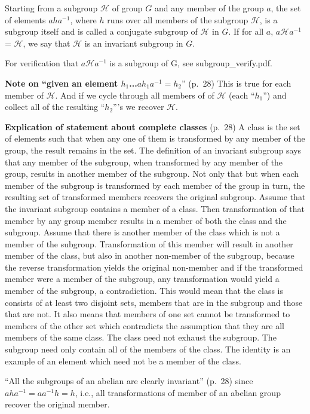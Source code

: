 Starting from a subgroup $\mathcal H$ of group $G$ and any member of
the group $a$, the set of elements $aha^{-1}$, where $h$ runs over all
members of the subgroup $\mathcal H$, is a subgroup itself and is
called a conjugate subgroup of $\mathcal H$ in $G$. If for all $a$,
$a{\mathcal H} a^{-1}$ = $\mathcal H$, we say that $\mathcal H$ is an
invariant subgroup in $G$.

For verification that $a\mathcal Ha^{-1}$ is a subgroup of G, see
subgroup\_verify.pdf.

{\bf Note on ``given an element $h_1$...$ah_1a^{-1} = h_2$}'' (p.\ 28) This is true for each member of $\mathcal H$. And if we cycle
through all members of of $\mathcal H$ (each ``$h_1$'') and collect
all of the resulting ``$h_2$'''s we recover $\mathcal H$.

{\bf Explication of statement about complete classes} (p.\ 28) A class
is the set of elements such that when any one of them is transformed
by any member of the group, the result remains in the set. The
definition of an invariant subgroup says that any member of the
subgroup, when transformed by any member of the group, results in
another member of the subgroup.  Not only that but when each member of
the subgroup is transformed by each member of the group in turn, the
resulting set of transformed members recovers the original
subgroup. Assume that the invariant subgroup contains a member of a
class. Then transformation of that member by any group member results
in a member of both the class and the subgroup. Assume that there is
another member of the class which is not a member of the
subgroup. Transformation of this member will result in another member
of the class, but also in another non-member of the subgroup, because
the reverse transformation yields the original non-member and if the
transformed member were a member of the subgroup, any transformation
would yield a member of the subgroup, a contradiction. This would mean
that the class is consists of at least two disjoint sets, members that
are in the subgroup and those that are not. It also means that members
of one set cannot be transformed to members of the other set which
contradicts the assumption that they are all members of the same
class. The class need not exhaust the subgroup. The subgroup need only
contain all of the members of the class. The identity is an example of
an element which need not be a member of the class.

``All the subgroups of an abelian are clearly invariant'' (p.\ 28) since $aha^{-1} = aa^{-1}h = h$, i.e., all transformations of member of an abelian group recover the original member.


